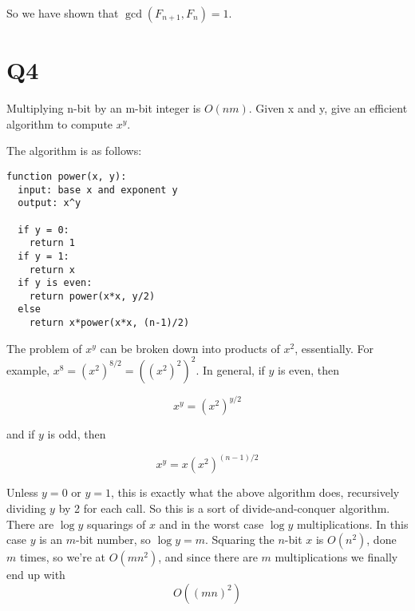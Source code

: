 \documentclass{article}
\begin{document}
So we have shown that $\gcd(F_{n+1}, F_n) = 1$.


\section*{Q4}

Multiplying n-bit by an m-bit integer is $O(nm)$. Given x and y, give an efficient algorithm to compute $x^y$.

The algorithm is as follows:

\begin{lstlisting}
function power(x, y):
  input: base x and exponent y
  output: x^y

  if y = 0:
    return 1
  if y = 1:
    return x
  if y is even:
    return power(x*x, y/2) 
  else
    return x*power(x*x, (n-1)/2)

\end{lstlisting}

The problem of $x^y$ can be broken down into products of $x^2$, essentially. For example, $x^8 = (x^2)^{8/2} = ((x^2)^2)^2$. In general, if $y$ is even, then

$$x^y = (x^2)^{y/2}$$

and if $y$ is odd, then

$$x^y = x(x^2)^{(n-1)/2}$$

Unless $y =0$ or $y=1$, this is exactly what the above algorithm does, recursively dividing $y$ by 2 for each call. So this is a sort of divide-and-conquer algorithm. There are $\log y$ squarings of $x$ and in the worst case $\log y$ multiplications. In this case $y$ is an $m$-bit number, so $\log y = m$. Squaring the $n$-bit $x$ is $O(n^2)$, done $m$ times, so we're at $O(mn^2)$, and since there are $m$ multiplications we finally end up with $$O((mn)^2)$$ 
\end{document}
